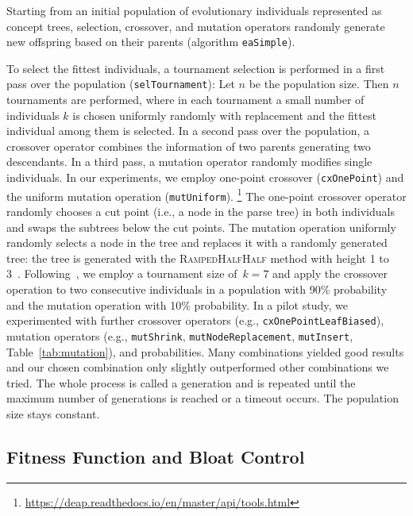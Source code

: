 Starting from an initial population of evolutionary individuals represented as concept trees, selection, crossover, and mutation operators randomly generate new offspring based on their parents (algorithm \texttt{eaSimple}\cite{back2018evolutionary}).

To select the fittest individuals, a tournament selection is performed in a first pass over the population (\texttt{selTournament}): Let $n$ be the population size. Then $n$ tournaments are performed, where in each tournament a small number of individuals $k$ is chosen uniformly randomly with replacement and the fittest individual among them is selected. In a second pass over the population,  a crossover operator combines the information of two parents generating two descendants. In a third pass, a mutation operator randomly modifies single individuals. In our experiments, we employ one-point crossover (\texttt{cxOnePoint}) and the uniform mutation operation (\texttt{mutUniform}).%
\footnote{\url{https://deap.readthedocs.io/en/master/api/tools.html}}
The one-point crossover operator randomly chooses a cut point (i.e., a node in the parse tree) in both individuals and swaps the subtrees below the cut points. The mutation operation uniformly randomly selects a node in the tree and replaces it with a randomly generated tree: the tree is generated with the \textsc{RampedHalfHalf} method with height 1 to 3~\citep{Koza1992GP}. Following~\citet{Koza1992GP}, we employ a tournament size of~$k=7$ and apply the crossover operation to two consecutive individuals in a population with 90\% probability and the mutation operation with 10\% probability. In a pilot study, we experimented with further crossover operators (e.g., \texttt{cx\-One\-Point\-Leaf\-Biased}), mutation operators (e.g., \texttt{mut\-Shrink}, \texttt{mut\-Node\-Re\-place\-ment}, \texttt{mut\-Insert},  Table~\ref{tab:mutation}), and probabilities. Many combinations yielded good results and our chosen combination only slightly outperformed other combinations we tried. The whole process is called a generation and is repeated until the maximum number of generations is reached or a timeout occurs. The population size stays constant.

\subsection{Fitness Function and Bloat Control}

